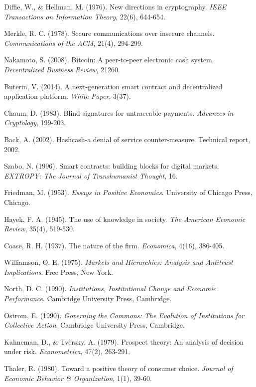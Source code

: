 \documentclass[12pt,a4paper]{article}
\begin{document}
\begin{thebibliography}{99}
 Diffie, W., \& Hellman, M. (1976). New directions in cryptography. \textit{IEEE Transactions on Information Theory}, 22(6), 644-654.

 Merkle, R. C. (1978). Secure communications over insecure channels. \textit{Communications of the ACM}, 21(4), 294-299.

 Nakamoto, S. (2008). Bitcoin: A peer-to-peer electronic cash system. \textit{Decentralized Business Review}, 21260.

 Buterin, V. (2014). A next-generation smart contract and decentralized application platform. \textit{White Paper}, 3(37).

 Chaum, D. (1983). Blind signatures for untraceable payments. \textit{Advances in Cryptology}, 199-203.

 Back, A. (2002). Hashcash-a denial of service counter-measure. Technical report, 2002.

 Szabo, N. (1996). Smart contracts: building blocks for digital markets. \textit{EXTROPY: The Journal of Transhumanist Thought}, 16.

 Friedman, M. (1953). \textit{Essays in Positive Economics}. University of Chicago Press, Chicago.

 Hayek, F. A. (1945). The use of knowledge in society. \textit{The American Economic Review}, 35(4), 519-530.

 Coase, R. H. (1937). The nature of the firm. \textit{Economica}, 4(16), 386-405.

 Williamson, O. E. (1975). \textit{Markets and Hierarchies: Analysis and Antitrust Implications}. Free Press, New York.

 North, D. C. (1990). \textit{Institutions, Institutional Change and Economic Performance}. Cambridge University Press, Cambridge.

 Ostrom, E. (1990). \textit{Governing the Commons: The Evolution of Institutions for Collective Action}. Cambridge University Press, Cambridge.

 Kahneman, D., \& Tversky, A. (1979). Prospect theory: An analysis of decision under risk. \textit{Econometrica}, 47(2), 263-291.

 Thaler, R. (1980). Toward a positive theory of consumer choice. \textit{Journal of Economic Behavior \& Organization}, 1(1), 39-60.


\end{thebibliography}
\end{document}
